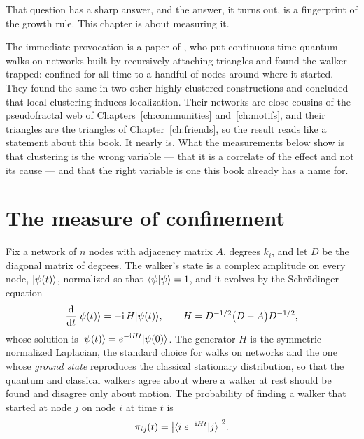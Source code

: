 That question has a sharp answer, and the answer, it turns out, is a fingerprint of
the growth rule. This chapter is about measuring it.

The immediate provocation is a paper of \citet{boettcher2025localization}, who put
continuous-time quantum walks on networks built by recursively attaching triangles
and found the walker trapped: confined for all time to a handful of nodes around
where it started. They found the same in two other highly clustered constructions
and concluded that local clustering induces localization. Their networks are close
cousins of the pseudofractal web of Chapters~\ref{ch:communities}
and~\ref{ch:motifs}, and their triangles are the triangles of
Chapter~\ref{ch:friends}, so the result reads like a statement about this book. It
nearly is. What the measurements below show is that clustering is the wrong
variable --- that it is a correlate of the effect and not its cause --- and that the
right variable is one this book already has a name for.

\section{The measure of confinement}

Fix a network of $n$ nodes with adjacency matrix $A$, degrees $k_i$, and let $D$ be
the diagonal matrix of degrees. The walker's state is a complex amplitude on every
node, $\lvert \psi(t) \rangle$, normalized so that $\langle \psi|\psi \rangle=1$, and it evolves by
the Schr\"odinger equation
\begin{equation}
  \frac{\mathrm{d}}{\mathrm{d}t}\lvert \psi(t) \rangle = -\mathrm{i}\,H\lvert \psi(t) \rangle,
  \qquad
  H = D^{-1/2}\big(D-A\big)D^{-1/2},
  \label{eq:qw-schrodinger}
\end{equation}
whose solution is $\lvert \psi(t) \rangle=e^{-\mathrm{i}Ht}\lvert \psi(0) \rangle$. The generator $H$
is the symmetric normalized Laplacian, the standard choice for walks on networks
\citep{faccin2013,boettcher2025localization} and the one whose \emph{ground state}
reproduces the classical stationary distribution, so that the quantum and classical
walkers agree about where a walker at rest should be found and disagree only about
motion. The probability of finding a walker that started at node $j$ on node $i$ at
time $t$ is
\begin{equation}
  \pi_{ij}(t) = \big|\langle i \rvert e^{-\mathrm{i}Ht}\lvert j \rangle\big|^2 .
  \label{eq:qw-prob}
\end{equation}

